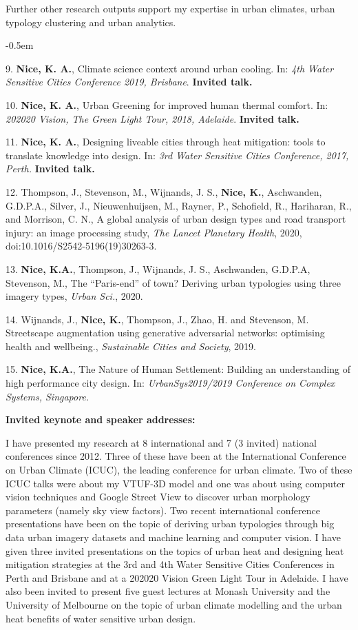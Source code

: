 Further other research outputs support my expertise in urban climates, urban typology clustering and urban analytics.
\begin{list}{}{}
\itemsep-0.5em
\item [9.] \textbf{Nice, K. A.}, Climate science context around urban cooling. In: \textit{4th Water Sensitive Cities Conference 2019, Brisbane}. \textbf{Invited talk.}
\item [10.] \textbf{Nice, K. A.}, Urban Greening for improved human thermal comfort. In: \textit{202020 Vision, The Green Light Tour, 2018, Adelaide}. \textbf{Invited talk.}
\item [11.] \textbf{Nice, K. A.}, Designing liveable cities through heat mitigation: tools to translate knowledge into design. In: \textit{3rd Water Sensitive Cities Conference, 2017, Perth.} \textbf{Invited talk.}
\item [12.] Thompson, J., Stevenson, M., Wijnands, J. S., \textbf{Nice, K.}, Aschwanden, G.D.P.A., Silver, J., Nieuwenhuijsen, M., Rayner, P., Schofield, R., Hariharan, R., and Morrison, C. N., A global analysis of urban design types and road transport injury: an image processing study, \textit{The Lancet Planetary Health}, 2020, doi:10.1016/S2542-5196(19)30263-3. 
\item [13.] \textbf{Nice, K.A.}, Thompson, J., Wijnands, J. S., Aschwanden, G.D.P.A, Stevenson, M., The “Paris-end” of town? Deriving urban typologies using three imagery types, \textit{Urban Sci.}, 2020.
\item [14.] Wijnands, J., \textbf{Nice, K.}, Thompson, J., Zhao, H. and Stevenson, M. Streetscape augmentation using generative adversarial networks: optimising health and wellbeing., \textit{Sustainable Cities and Society}, 2019.
\item [15.] \textbf{Nice, K.A.}, The Nature of Human Settlement: Building an understanding of high performance city design. In: \textit{UrbanSys2019/2019 Conference on Complex Systems, Singapore.}
\end{list}


\textbf{Invited keynote and speaker addresses:}

I have presented my research at 8 international and 7 (3 invited) national conferences since 2012. Three of these have been at the International Conference on Urban Climate (ICUC), the leading conference for urban climate. Two of these ICUC talks were about my VTUF-3D model and one was about using computer vision techniques and Google Street View to discover urban morphology parameters (namely sky view factors). Two recent international conference presentations have been on the topic of deriving urban typologies through big data urban imagery datasets and machine learning and computer vision. I have given three invited presentations on the topics of urban heat and designing heat mitigation strategies at the 3rd and 4th Water Sensitive Cities Conferences in Perth and Brisbane and at a 202020 Vision Green Light Tour in Adelaide. I have also been invited to present five guest lectures at Monash University and the University of Melbourne on the topic of urban climate modelling and the urban heat benefits of water sensitive urban design. 

